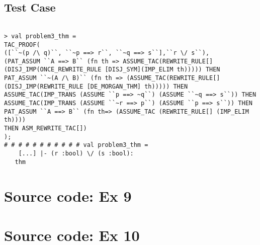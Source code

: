 \documentclass{report}
\begin{document}
\section{Test Case}
\label{trans-10-4-3}
\begin{session}
  \begin{scriptsize}
\begin{verbatim}

> val problem3_thm =
TAC_PROOF(
([``~(p /\ q)``, ``~p ==> r``, ``~q ==> s``],``r \/ s``),
(PAT_ASSUM ``A ==> B`` (fn th => ASSUME_TAC(REWRITE_RULE[]
(DISJ_IMP(ONCE_REWRITE_RULE [DISJ_SYM](IMP_ELIM th))))) THEN
PAT_ASSUM ``~(A /\ B)`` (fn th => (ASSUME_TAC(REWRITE_RULE[]
(DISJ_IMP(REWRITE_RULE [DE_MORGAN_THM] th))))) THEN
ASSUME_TAC(IMP_TRANS (ASSUME ``p ==> ~q``) (ASSUME ``~q ==> s``)) THEN
ASSUME_TAC(IMP_TRANS (ASSUME ``~r ==> p``) (ASSUME ``p ==> s``)) THEN
PAT_ASSUM ``A ==> B`` (fn th=> (ASSUME_TAC (REWRITE_RULE[] (IMP_ELIM th))))
THEN ASM_REWRITE_TAC[])
);
# # # # # # # # # # # val problem3_thm =
    [...] |- (r :bool) \/ (s :bool):
   thm

\end{verbatim}
  \end{scriptsize}
\end{session}


\appendix{}

\chapter{Source code: Ex 9}
\label{cha:source-code-ex9}



\chapter{Source code: Ex 10}
\label{cha:source-code-ex10}

\end{document}

